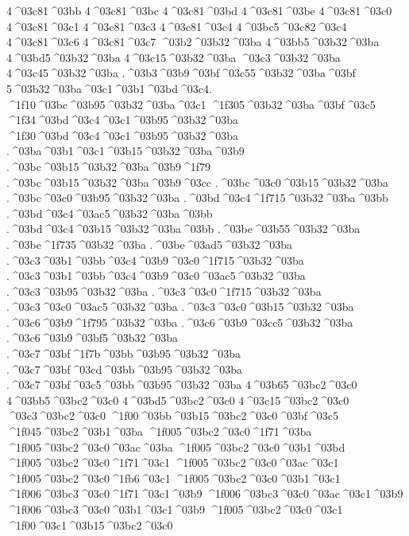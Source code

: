{4^^^^03c81^^^^03bb
4^^^^03c81^^^^03bc
4^^^^03c81^^^^03bd
4^^^^03c81^^^^03be
4^^^^03c81^^^^03c0
4^^^^03c81^^^^03c1
4^^^^03c81^^^^03c3
4^^^^03c81^^^^03c4
4^^^^03bc5^^^^03c82^^^^03c4
4^^^^03c81^^^^03c6
4^^^^03c81^^^^03c7
^^^^03b2^^^^03b32^^^^03ba
4^^^^03bb5^^^^03b32^^^^03ba
4^^^^03bd5^^^^03b32^^^^03ba
4^^^^03c15^^^^03b32^^^^03ba
^^^^03c3^^^^03b32^^^^03ba
4^^^^03c45^^^^03b32^^^^03ba
.^^^^03b3^^^^03b9^^^^03bf^^^^03c55^^^^03b32^^^^03ba^^^^03bf
5^^^^03b32^^^^03ba^^^^03c1^^^^03b1^^^^03bd^^^^03c4.
^^^^1f10^^^^03bc^^^^03b95^^^^03b32^^^^03ba^^^^03c1
^^^^1f305^^^^03b32^^^^03ba^^^^03bf^^^^03c5
^^^^1f34^^^^03bd^^^^03c4^^^^03c1^^^^03b95^^^^03b32^^^^03ba
^^^^1f30^^^^03bd^^^^03c4^^^^03c1^^^^03b95^^^^03b32^^^^03ba
.^^^^03ba^^^^03b1^^^^03c1^^^^03b15^^^^03b32^^^^03ba^^^^03b9
.^^^^03bc^^^^03b15^^^^03b32^^^^03ba^^^^03b9^^^^1f79  .^^^^03bc^^^^03b15^^^^03b32^^^^03ba^^^^03b9^^^^03cc
.^^^^03bc^^^^03c0^^^^03b15^^^^03b32^^^^03ba
.^^^^03bc^^^^03c0^^^^03b95^^^^03b32^^^^03ba
.^^^^03bd^^^^03c4^^^^1f715^^^^03b32^^^^03ba^^^^03bb  .^^^^03bd^^^^03c4^^^^03ac5^^^^03b32^^^^03ba^^^^03bb
.^^^^03bd^^^^03c4^^^^03b15^^^^03b32^^^^03ba^^^^03bb
.^^^^03be^^^^03b55^^^^03b32^^^^03ba
.^^^^03be^^^^1f735^^^^03b32^^^^03ba  .^^^^03be^^^^03ad5^^^^03b32^^^^03ba
.^^^^03c3^^^^03b1^^^^03bb^^^^03c4^^^^03b9^^^^03c0^^^^1f715^^^^03b32^^^^03ba  .^^^^03c3^^^^03b1^^^^03bb^^^^03c4^^^^03b9^^^^03c0^^^^03ac5^^^^03b32^^^^03ba
.^^^^03c3^^^^03b95^^^^03b32^^^^03ba
.^^^^03c3^^^^03c0^^^^1f715^^^^03b32^^^^03ba  .^^^^03c3^^^^03c0^^^^03ac5^^^^03b32^^^^03ba
.^^^^03c3^^^^03c0^^^^03b15^^^^03b32^^^^03ba
.^^^^03c6^^^^03b9^^^^1f795^^^^03b32^^^^03ba  .^^^^03c6^^^^03b9^^^^03cc5^^^^03b32^^^^03ba
.^^^^03c6^^^^03b9^^^^03bf5^^^^03b32^^^^03ba
.^^^^03c7^^^^03bf^^^^1f7b^^^^03bb^^^^03b95^^^^03b32^^^^03ba  .^^^^03c7^^^^03bf^^^^03cd^^^^03bb^^^^03b95^^^^03b32^^^^03ba
.^^^^03c7^^^^03bf^^^^03c5^^^^03bb^^^^03b95^^^^03b32^^^^03ba
4^^^^03b65^^^^03bc2^^^^03c0
4^^^^03bb5^^^^03bc2^^^^03c0
4^^^^03bd5^^^^03bc2^^^^03c0
4^^^^03c15^^^^03bc2^^^^03c0
^^^^03c3^^^^03bc2^^^^03c0
^^^^1f00^^^^03bb^^^^03b15^^^^03bc2^^^^03c0^^^^03bf^^^^03c5
^^^^1f045^^^^03bc2^^^^03b1^^^^03ba
^^^^1f005^^^^03bc2^^^^03c0^^^^1f71^^^^03ba  ^^^^1f005^^^^03bc2^^^^03c0^^^^03ac^^^^03ba
^^^^1f005^^^^03bc2^^^^03c0^^^^03b1^^^^03bd
^^^^1f005^^^^03bc2^^^^03c0^^^^1f71^^^^03c1  ^^^^1f005^^^^03bc2^^^^03c0^^^^03ac^^^^03c1
^^^^1f005^^^^03bc2^^^^03c0^^^^1fb6^^^^03c1
^^^^1f005^^^^03bc2^^^^03c0^^^^03b1^^^^03c1
^^^^1f006^^^^03bc3^^^^03c0^^^^1f71^^^^03c1^^^^03b9  ^^^^1f006^^^^03bc3^^^^03c0^^^^03ac^^^^03c1^^^^03b9
^^^^1f006^^^^03bc3^^^^03c0^^^^03b1^^^^03c1^^^^03b9
^^^^1f005^^^^03bc2^^^^03c0^^^^03c1
^^^^1f00^^^^03c1^^^^03b15^^^^03bc2^^^^03c0
}
